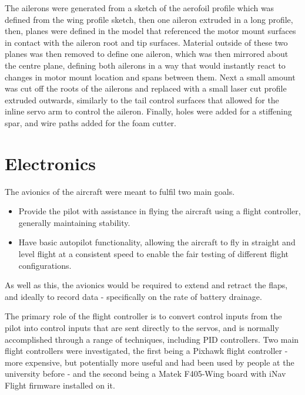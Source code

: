 \documentclass[../../main.tex]{subfiles}
\begin{document}
The ailerons were generated from a sketch of the aerofoil profile which was defined from the wing profile sketch, then one aileron extruded in a long profile, then, planes were defined in the model that referenced the motor mount surfaces in contact with the aileron root and tip surfaces.
Material outside of these two planes was then removed to define one aileron, which was then mirrored about the centre plane, defining both ailerons in a way that would instantly react to changes in motor mount location and spans between them.
Next a small amount was cut off the roots of the ailerons and replaced with a small laser cut profile extruded outwards, similarly to the tail control surfaces that allowed for the inline servo arm to control the aileron.
Finally, holes were added for a stiffening spar, and wire paths added for the foam cutter. 

\section{Electronics} \label{sec:final-design-proposal:electronics}


The avionics of the aircraft were meant to fulfil two main goals.

\begin{itemize}
    \item Provide the pilot with assistance in flying the aircraft using a flight controller, generally maintaining stability. 
    \item Have basic autopilot functionality, allowing the aircraft to fly in straight and level flight at a consistent speed to enable the fair testing of different flight configurations. 
\end{itemize}

As well as this, the avionics would be required to extend and retract the flaps, and ideally to record data - specifically on the rate of battery drainage. 

The primary role of the flight controller is to convert control inputs from the pilot into control inputs that are sent directly to the servos, and is normally accomplished through a range of techniques, including PID controllers.
Two main flight controllers were investigated, the first being a Pixhawk flight controller - more expensive, but potentially more useful and had been used by people at the university before - and the second being a Matek F405-Wing board with iNav Flight firmware installed on it. 
\end{document}
